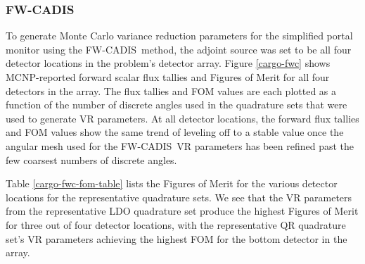 \documentclass{article} %
\newcommand{\fwc}{\mbox{FW-CADIS}}
\begin{document}
\FloatBarrier
\subsubsection{\fwc}

To generate Monte Carlo variance reduction parameters for the simplified portal
monitor using the \fwc\ method, the adjoint source was set to be all four
detector locations in the problem's detector array.
Figure \ref{cargo-fwc} shows MCNP-reported forward scalar flux tallies and
Figures of Merit for all four detectors in the array. The flux tallies and FOM
values are each plotted as a function of the number of discrete angles used in
the quadrature sets that were used to generate VR parameters. At all
detector locations, the forward flux tallies and FOM values show the same
trend of leveling off to a stable value once the angular mesh used for the
\fwc\ VR parameters has been refined past the few coarsest numbers of discrete
angles.

Table \ref{cargo-fwc-fom-table} lists the Figures of Merit for the various
detector locations for the representative quadrature sets. We see that the
VR parameters from the representative LDO quadrature set produce the
highest Figures of Merit for three out of four detector locations, with the
representative QR quadrature set's VR parameters achieving the highest FOM
for the bottom detector in the array.
\end{document}

